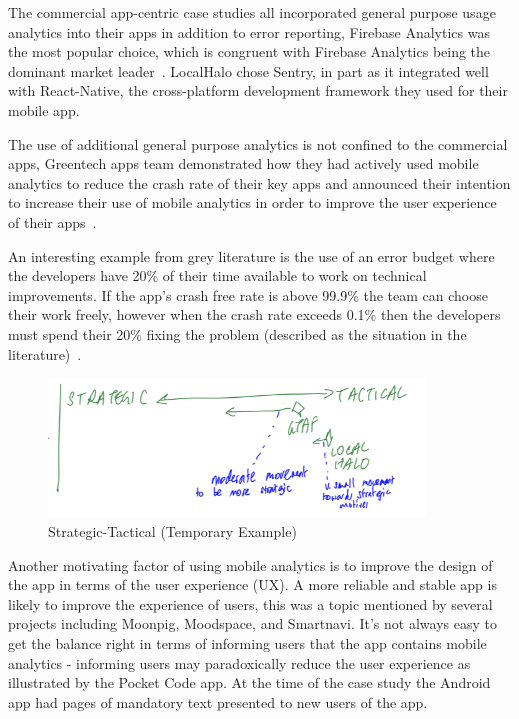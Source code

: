 The commercial app-centric case studies all incorporated general purpose usage analytics into their apps in addition to error reporting, Firebase Analytics was the most popular choice, which is congruent with Firebase Analytics being the dominant market leader~\citep{appbrain_firebase}. LocalHalo chose Sentry, in part as it integrated well with React-Native, the cross-platform development framework they used for their mobile app.

The use of additional general purpose analytics is not confined to the commercial apps, Greentech apps team demonstrated how they had actively used mobile analytics to reduce the crash rate of their key apps and announced their intention to increase their use of mobile analytics in order to improve the user experience of their apps~\citep{gtafblog2021_gtaf_accomplishment_2020}. 

An interesting example from grey literature is the use of an error budget where the developers have 20\% of their time available to work on technical improvements. If the app's crash free rate is above 99.9\% the team can choose their work freely, however when the crash rate exceeds 0.1\% then the developers must spend their 20\% fixing the problem (described as the situation in the literature)~\citep{koutun2021_how_to_deal_with_tech_debt_at_the_scale_of_super_app}.

\begin{figure}
    \centering
    \includegraphics[width=10cm]{images/rough-sketches/aiu-strategic-tactical-example.png}
    \caption{Strategic-Tactical (Temporary Example)}
    \label{fig:aiu-strategic-tactical-example}
\end{figure}



Another motivating factor of using mobile analytics is to improve the design of the app in terms of the user experience (UX). A more reliable and stable app is likely to improve the experience of users, this was a topic mentioned by several projects including Moonpig, Moodspace, and Smartnavi. It's not always easy to get the balance right in terms of informing users that the app contains mobile analytics - informing users may paradoxically reduce the user experience as illustrated by the Pocket Code app. At the time of the case study the Android app had pages of mandatory text presented to new users of the app.


